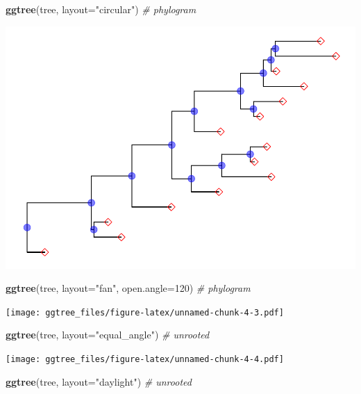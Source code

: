 \documentclass[]{article}
\newenvironment{Shaded}{\begin{snugshade}}{\end{snugshade}}
\newcommand{\KeywordTok}[1]{\textcolor[rgb]{0.13,0.29,0.53}{\textbf{#1}}}
\newcommand{\DataTypeTok}[1]{\textcolor[rgb]{0.13,0.29,0.53}{#1}}
\newcommand{\DecValTok}[1]{\textcolor[rgb]{0.00,0.00,0.81}{#1}}
\newcommand{\StringTok}[1]{\textcolor[rgb]{0.31,0.60,0.02}{#1}}
\newcommand{\CommentTok}[1]{\textcolor[rgb]{0.56,0.35,0.01}{\textit{#1}}}
\newcommand{\NormalTok}[1]{#1}
\begin{document}
\begin{Shaded}
\begin{Highlighting}[]
\KeywordTok{ggtree}\NormalTok{(tree, }\DataTypeTok{layout=}\StringTok{"circular"}\NormalTok{) }\CommentTok{# phylogram}
\end{Highlighting}
\end{Shaded}

\includegraphics{ggtree_files/figure-latex/unnamed-chunk-4-2.pdf}

\begin{Shaded}
\begin{Highlighting}[]
\KeywordTok{ggtree}\NormalTok{(tree, }\DataTypeTok{layout=}\StringTok{"fan"}\NormalTok{, }\DataTypeTok{open.angle=}\DecValTok{120}\NormalTok{) }\CommentTok{# phylogram}
\end{Highlighting}
\end{Shaded}

\texttt{[image: ggtree\_files/figure-latex/unnamed-chunk-4-3.pdf]}

\begin{Shaded}
\begin{Highlighting}[]
\KeywordTok{ggtree}\NormalTok{(tree, }\DataTypeTok{layout=}\StringTok{"equal_angle"}\NormalTok{) }\CommentTok{# unrooted}
\end{Highlighting}
\end{Shaded}

\texttt{[image: ggtree\_files/figure-latex/unnamed-chunk-4-4.pdf]}

\begin{Shaded}
\begin{Highlighting}[]
\KeywordTok{ggtree}\NormalTok{(tree, }\DataTypeTok{layout=}\StringTok{"daylight"}\NormalTok{) }\CommentTok{# unrooted}
\end{Highlighting}
\end{Shaded}
\end{document}
